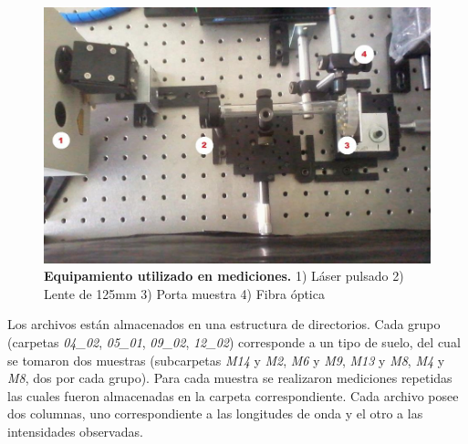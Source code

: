 \documentclass[12pt]{article}
\begin{document}
\begin{figure}[htbp]
    \centering
    \includegraphics[width=15cm]{Setup LIBS.jpg}
    \caption{\textbf{Equipamiento utilizado en mediciones.} 1) Láser pulsado 2) Lente de 125mm 3) Porta muestra  4) Fibra óptica}
    \label{fig:LIBS2}
\end{figure}

Los archivos están almacenados en una estructura de directorios. Cada grupo (carpetas \textit{04\_02}, \textit{05\_01}, \textit{09\_02}, \textit{12\_02}) corresponde a un tipo de suelo, del cual se tomaron dos muestras (subcarpetas \textit{M14} y \textit{M2}, \textit{M6} y \textit{M9}, \textit{M13} y \textit{M8}, \textit{M4} y \textit{M8}, dos por cada grupo). Para cada muestra se realizaron mediciones repetidas las cuales fueron almacenadas en la carpeta correspondiente. Cada archivo posee dos columnas, uno correspondiente a las longitudes de onda y el otro a las intensidades observadas.

\end{document}
